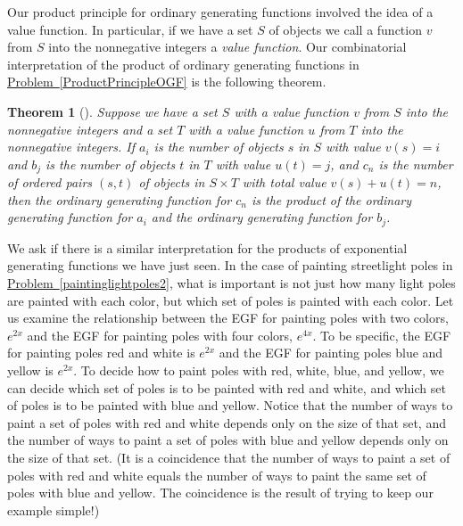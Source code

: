\documentclass[10pt,]{book}
\theoremstyle{plain}
\newtheorem{theorem}{Theorem}[section]
\theoremstyle{definition}
\numberwithin{equation}{chapter}
\begin{document}
Our product principle for ordinary generating functions involved the idea of a value function. In particular, if we have a set \(S\) of objects we call a function \(v\) from \(S\) into the nonnegative integers a \emph{value function}. Our combinatorial interpretation of the product of ordinary generating functions in \hyperref[ProductPrincipleOGF]{Problem~\ref{ProductPrincipleOGF}} is the following theorem.%
\begin{theorem}[{}]\label{theorem-12}
Suppose we have a set \(S\) with a value function \(v\) from \(S\) into the nonnegative integers and a set \(T\) with a value function \(u\) from \(T\) into the nonnegative integers. If \(a_i\) is the number of objects \(s\) in \(S\) with value \(v(s) =i\) and \(b_j\) is the number of objects \(t\) in \(T\) with value \(u(t)= j\), and \(c_n\) is the number of ordered pairs \((s,t)\) of objects in \(S\times T\) with total value \(v(s) + u(t) =n\), then the ordinary generating function for \(c_n\) is the product of the ordinary generating function for \(a_i\) and the ordinary generating function for \(b_j\).%
\end{theorem}
We ask if there is a similar interpretation for the products of exponential generating functions we have just seen. In the case of painting streetlight poles in \hyperref[paintinglightpoles2]{Problem~\ref{paintinglightpoles2}}, what is important is not just how many light poles are painted with each color, but which set of poles is painted with each color. Let us examine the relationship between the EGF for painting poles with two colors, \(e^{2x}\) and the EGF for painting poles with four colors, \(e^{4x}\). To be specific, the EGF for painting poles red and white is \(e^{2x}\) and the EGF for painting poles blue and yellow is \(e^{2x}\). To decide how to paint poles with red, white, blue, and yellow, we can decide which set of poles is to be painted with red and white, and which set of poles is to be painted with blue and yellow. Notice that the number of ways to paint a set of poles with red and white depends only on the size of that set, and the number of ways to paint a set of poles with blue and yellow depends only on the size of that set. (It is a coincidence that the number of ways to paint a set of poles with red and white equals the number of ways to paint the same set of poles with blue and yellow. The coincidence is the result of trying to keep our example simple!)%
\end{document}
